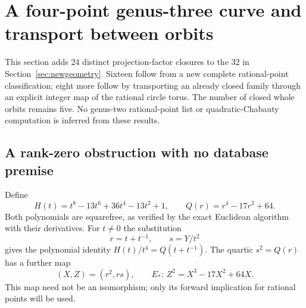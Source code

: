 \documentclass[11pt,letterpaper]{article}
\theoremstyle{definition}\newtheorem{definition}[theorem]{Definition}
\theoremstyle{remark}\newtheorem{remark}[theorem]{Remark}
\begin{document}
\section{A four-point genus-three curve and transport between orbits}\label{sec:torusprogress}
This section adds 24 distinct projection-factor closures to the 32 in Section~\ref{sec:newgeometry}. Sixteen follow from a new complete rational-point classification; eight more follow by transporting an already closed family through an explicit integer map of the rational circle torus. The number of closed whole orbits remains five. No genus-two rational-point list or quadratic-Chabauty computation is inferred from these results.

\subsection{A rank-zero obstruction with no database premise}
Define
\begin{equation}\label{eq:newH}
 H(t)=t^8-13t^6+36t^4-13t^2+1,
 \qquad Q(r)=r^4-17r^2+64.
\end{equation}
Both polynomials are squarefree, as verified by the exact Euclidean algorithm with their derivatives. For $t\ne0$ the substitution
\begin{equation}\label{eq:newHmap}
 r=t+t^{-1},\qquad s=Y/t^2
\end{equation}
gives the polynomial identity $H(t)/t^4=Q(t+t^{-1})$. The quartic $s^2=Q(r)$ has a further map
\begin{equation}\label{eq:newEmap}
 (X,Z)=(r^2,rs),\qquad
 E_*:\ Z^2=X^3-17X^2+64X.
\end{equation}
This map need not be an isomorphism; only its forward implication for rational points will be used.
\end{document}

